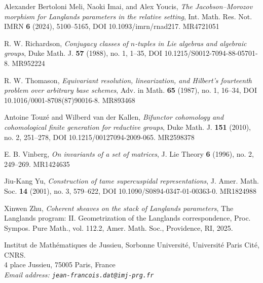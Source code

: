 \begin{refs}
\item[{[MIY22]}] Alexander Bertoloni Meli, Naoki Imai, and Alex Youcis, \emph{The Jacobson--Morozov morphism for Langlands parameters in the relative setting}, Int. Math. Res. Not. IMRN \textbf{6} (2024), 5100--5165, DOI 10.1093/imrn/rnad217. MR4721051
\item[{[Ric88]}] R. W. Richardson, \emph{Conjugacy classes of $n$-tuples in Lie algebras and algebraic groups}, Duke Math. J. \textbf{57} (1988), no. 1, 1--35, DOI 10.1215/S0012-7094-88-05701-8. MR952224
\item[{[Tho87]}] R. W. Thomason, \emph{Equivariant resolution, linearization, and Hilbert's fourteenth problem over arbitrary base schemes}, Adv. in Math. \textbf{65} (1987), no. 1, 16--34, DOI 10.1016/0001-8708(87)90016-8. MR893468
\item[{[TvdK10]}] Antoine Touz\'e and Wilberd van der Kallen, \emph{Bifunctor cohomology and cohomological finite generation for reductive groups}, Duke Math. J. \textbf{151} (2010), no. 2, 251--278, DOI 10.1215/00127094-2009-065. MR2598378
\item[{[Vin96]}] E. B. Vinberg, \emph{On invariants of a set of matrices}, J. Lie Theory \textbf{6} (1996), no. 2, 249--269. MR1424635
\item[{[Yu01]}] Jiu-Kang Yu, \emph{Construction of tame supercuspidal representations}, J. Amer. Math. Soc. \textbf{14} (2001), no. 3, 579--622, DOI 10.1090/S0894-0347-01-00363-0. MR1824988
\item[{[Zhu25]}] Xinwen Zhu, \emph{Coherent sheaves on the stack of Langlands parameters}, The Langlands program: II. Geometrization of the Langlands correspondence, Proc. Sympos. Pure Math., vol. 112.2, Amer. Math. Soc., Providence, RI, 2025.
\end{refs}

\bigskip
\begin{center}
{\small Institut de Math\'ematiques de Jussieu, Sorbonne Universit\'e, Universit\'e Paris Cit\'e, CNRS.\\[0.2em]
4 place Jussieu, 75005 Paris, France\\[0.2em]
\itshape Email address: \texttt{jean-francois.dat@imj-prg.fr}}
\end{center}
